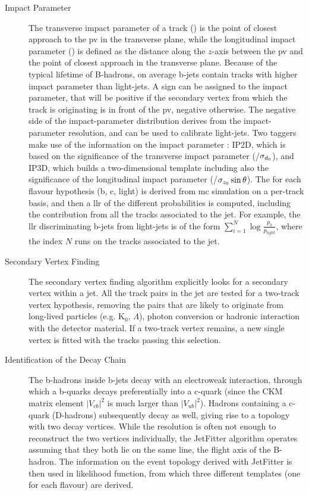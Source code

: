 \begin{description}

\item[Impact Parameter] The transverse impact parameter of a track (\dzero) is the point of closest approach to the 
\gls{pv} in the transverse plane, while the longitudinal impact parameter (\zzerost) is defined as the distance along 
the $z$-axis between the \gls{pv} and the point of closest approach in the transverse plane. Because of the typical 
lifetime of B-hadrons, on average b-jets contain tracks with higher impact parameter than light-jets. 
A sign can be 
assigned to the impact parameter, that will be positive if the secondary vertex from which the track is originating is 
in front of the \gls{pv}, negative otherwise. The negative side of the impact-parameter distribution derives from the 
impact-parameter resolution, and can be used to calibrate light-jets. Two taggers make use of the information on the impact parameter
 \cite{ATLAS:2011qia}: IP2D, which is based on the significance of the transverse impact parameter (\dzero/$\sigma_{d_0}$), and IP3D, which builds a two-dimensional template including also the significance of the longitudinal impact parameter (\zzerost/$\sigma_{z_0} \sin\theta$). The \pdf for each flavour hypothesis (b, c, light) is derived from \gls{mc} simulation on a per-track basis, and then a \gls{llr} of the different probabilities is computed, including the contribution from all the tracks associated to the jet. For example, the \gls{llr} discriminating b-jets from light-jets is of the form $\sum_{i=1}^{N}\log\frac{p_b}{p_{light}}$, where the index $N$ runs on the tracks associated to the jet. 

\item[Secondary Vertex Finding] The secondary vertex finding algorithm \cite{ATLAS:2011qia} explicitly looks for a secondary vertex within a jet. 
All the track pairs in the jet are tested for a two-track vertex hypothesis, removing the pairs that are likely to originate from 
long-lived particles (e.g. K$_0$, $\Lambda$), photon conversion or hadronic interaction with the detector material. 
If a two-track vertex remains, a new single vertex is fitted with the tracks passing this selection.

\item[Identification of the Decay Chain] The b-hadrons inside b-jets decay with an electroweak interaction, 
through which a b-quarks decays preferentially into a c-quark (since the CKM matrix element $|V_{cb}|^2$ is much larger than $|V_{ub}|^2$). Hadrons containing a c-quark (D-hadrons) subsequently decay as well, giving rise to a topology with two decay vertices. While the resolution is often not enough to reconstruct the two vertices individually, the JetFitter algorithm \cite{1742-6596-119-3-032032} operates assuming that they both lie on the same line, the flight axis of the B-hadron. The information on the event topology derived with JetFitter is then used in likelihood function, from which three different templates (one for each flavour) are derived.

\end{description}

